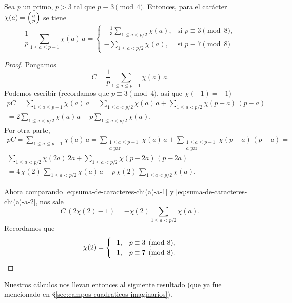 \begin{lema}
  Sea $p$ un primo, $p > 3$ tal que $p \equiv 3 \pmod{4}$. Entonces, para el
  carácter $\chi (a) = \left(\frac{a}{p}\right)$ se tiene
  \[ \frac{1}{p}\sum_{1 \le a \le p-1} \chi (a)\,a =
  \begin{cases}
    -\frac{1}{3}\sum\limits_{1 \le a < p/2} \chi (a), & \text{si }p\equiv 3\pmod{8},\\
    -\sum\limits_{1 \le a < p/2} \chi (a), & \text{si }p\equiv 7\pmod{8}
  \end{cases} \]

  \begin{proof}
    Pongamos
    $$C = \frac{1}{p}\sum_{1 \le a \le p-1} \chi (a)\,a.$$
    Podemos escribir (recordamos que $p \equiv 3 \pmod{4}$, así que
    $\chi (-1) = -1$)
    \begin{multline}
      \label{eq:suma-de-caracteres-chi(a)-a-1}
      p C = \sum_{1 \le a \le p-1} \chi (a)\,a =
      \sum_{1 \le a < p/2} \chi (a)\,a + \sum_{1 \le a < p/2} \chi (p-a)\,(p-a) \\
      = 2\sum_{1 \le a < p/2} \chi (a)\,a - p\sum_{1 \le a < p/2} \chi (a).
    \end{multline}
    Por otra parte,
    \begin{multline}
      \label{eq:suma-de-caracteres-chi(a)-a-2}
      p C = \sum_{1 \le a \le p-1} \chi (a)\,a =
      \sum_{\substack{1 \le a \le p-1 \\ a \text{ par}}} \chi (a)\,a + \sum_{\substack{1 \le a \le p-1 \\ a \text{ par}}} \chi (p-a)\,(p-a) = \\
      \sum_{1 \le a < p/2} \chi (2a)\,2a + \sum_{1 \le a < p/2} \chi (p-2a)\,(p-2a) = \\
      = 4\,\chi(2)\,\sum_{1 \le a < p/2} \chi (a)\,a - p\,\chi(2)\,\sum_{1 \le a < p/2} \chi (a).
    \end{multline}

    Ahora comparando \eqref{eq:suma-de-caracteres-chi(a)-a-1}
    y \eqref{eq:suma-de-caracteres-chi(a)-a-2}, nos sale
    \[ C \, (2\chi (2) - 1) = -\chi(2)\sum_{1 \le a < p/2} \chi (a). \]
    Recordamos que
    \[ \chi (2) = \begin{cases}
      -1, & p \equiv 3 \pmod{8},\\
      +1, & p \equiv 7 \pmod{8}.
    \end{cases} \qedhere \]
  \end{proof}
\end{lema}

Nuestros cálculos nos llevan entonces al siguiente resultado
(que ya fue mencionado en \S\ref{sec:campos-cuadraticos-imaginarios}).

